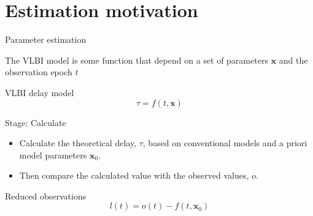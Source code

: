 \documentclass[14pt,table,t, c]{beamer}
\newcommand{\comment}[1]{{\slshape\color{kvred}#1}}
\begin{document}




\part{Estimation motivation}

\begin{frame}{Parameter estimation}

The VLBI model is some function that depend on a set of parameters $\mathbf{x}$ and the observation epoch $t$
\vspace*{\baselineskip}
\begin{block}{VLBI delay model}
\vspace*{-\baselineskip}\setlength\belowdisplayskip{0pt}\setlength\abovedisplayskip{0pt}
\begin{equation*}
\tau = f(t, \mathbf{x})
\end{equation*}
\end{block}
\end{frame}

\begin{frame}{Stage: Calculate}
\begin{itemize}
\item Calculate the theoretical delay, $\tau$, based on conventional models and a priori model parameters
$\mathbf{x}_0$.
\item Then compare the calculated value with the observed values, $o$.
\end{itemize}
\vspace*{\baselineskip}
\begin{block}{Reduced observations}
\vspace*{-\baselineskip}\setlength\belowdisplayskip{0pt}\setlength\abovedisplayskip{0pt}
\begin{equation*}
l(t) = o(t) - f(t, \mathbf{x}_0)
\end{equation*}
\end{block}
\end{frame}
\end{document}
